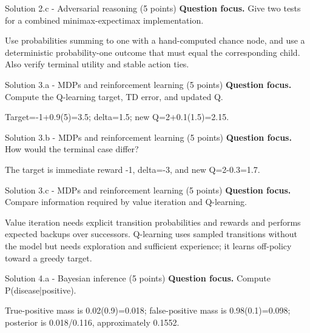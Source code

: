 \documentclass[aspectratio=169,11pt]{beamer}
\begin{document}
\begin{frame}{Solution 2.c - Adversarial reasoning (5 points)}
\small
\textbf{Question focus.} Give two tests for a combined minimax-expectimax implementation.

\vspace{0.25cm}
\answerlabel Use probabilities summing to one with a hand-computed chance node, and use a deterministic probability-one outcome that must equal the corresponding child. Also verify terminal utility and stable action ties.
\end{frame}

\begin{frame}{Solution 3.a - MDPs and reinforcement learning (5 points)}
\small
\textbf{Question focus.} Compute the Q-learning target, TD error, and updated Q.

\vspace{0.25cm}
\answerlabel Target=-1+0.9(5)=3.5; delta=1.5; new Q=2+0.1(1.5)=2.15.
\end{frame}

\begin{frame}{Solution 3.b - MDPs and reinforcement learning (5 points)}
\small
\textbf{Question focus.} How would the terminal case differ?

\vspace{0.25cm}
\answerlabel The target is immediate reward -1, delta=-3, and new Q=2-0.3=1.7.
\end{frame}

\begin{frame}{Solution 3.c - MDPs and reinforcement learning (5 points)}
\small
\textbf{Question focus.} Compare information required by value iteration and Q-learning.

\vspace{0.25cm}
\answerlabel Value iteration needs explicit transition probabilities and rewards and performs expected backups over successors. Q-learning uses sampled transitions without the model but needs exploration and sufficient experience; it learns off-policy toward a greedy target.
\end{frame}

\begin{frame}{Solution 4.a - Bayesian inference (5 points)}
\small
\textbf{Question focus.} Compute P(disease|positive).

\vspace{0.25cm}
\answerlabel True-positive mass is 0.02(0.9)=0.018; false-positive mass is 0.98(0.1)=0.098; posterior is 0.018/0.116, approximately 0.1552.
\end{frame}
\end{document}
